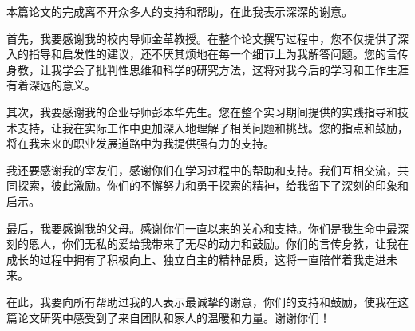 
\begin{acknowledgements}



本篇论文的完成离不开众多人的支持和帮助，在此我表示深深的谢意。

首先，我要感谢我的校内导师金革教授。在整个论文撰写过程中，您不仅提供了深入的指导和启发性的建议，还不厌其烦地在每一个细节上为我解答问题。您的言传身教，让我学会了批判性思维和科学的研究方法，这将对我今后的学习和工作生涯有着深远的意义。

其次，我要感谢我的企业导师彭本华先生。您在整个实习期间提供的实践指导和技术支持，让我在实际工作中更加深入地理解了相关问题和挑战。您的指点和鼓励，将在我未来的职业发展道路中为我提供强有力的支持。

我还要感谢我的室友们，感谢你们在学习过程中的帮助和支持。我们互相交流，共同探索，彼此激励。你们的不懈努力和勇于探索的精神，给我留下了深刻的印象和启示。

最后，我要感谢我的父母。感谢你们一直以来的关心和支持。你们是我生命中最深刻的恩人，你们无私的爱给我带来了无尽的动力和鼓励。你们的言传身教，让我在成长的过程中拥有了积极向上、独立自主的精神品质，这将一直陪伴着我走进未来。

在此，我要向所有帮助过我的人表示最诚挚的谢意，你们的支持和鼓励，使我在这篇论文研究中感受到了来自团队和家人的温暖和力量。谢谢你们！


\end{acknowledgements}
